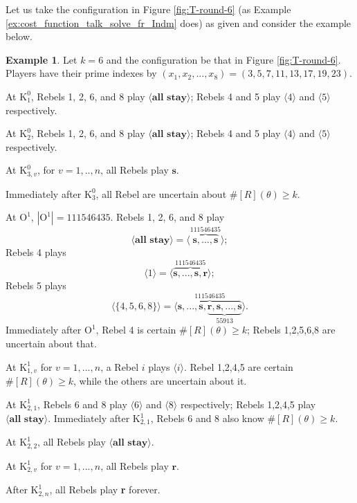\documentclass[12pt,letter]{article}
\newcommand{\Kappa}{\mathrm{K}}
\newcommand{\Omicron}{\mathrm{O}}
\theoremstyle{definition}
\newtheorem{example}{Example}
\theoremstyle{remark}
\theoremstyle{claim}
\begin{document}
Let us take the configuration in Figure \ref{fig:T-round-6} (as Example \ref{ex:cost_function_talk_solve_fr_Indm} does) as given and consider the example below.
\begin{example}
Let $k=6$ and the configuration be that in Figure \ref{fig:T-round-6}. Players have their prime indexes by $(x_1,x_2,...,x_8)=(3,5,7,11,13,17,19,23)$.

At $\Kappa^0_{1}$, Rebels 1, 2, 6, and 8 play $\langle \textbf{all stay} \rangle$; Rebels 4 and 5 play $\langle 4 \rangle$ and $\langle 5 \rangle$ respectively. 

At $\Kappa^0_{2}$, Rebels 1, 2, 6, and 8 play $\langle \textbf{all stay} \rangle$; Rebels 4 and 5 play $\langle 4 \rangle$ and $\langle 5 \rangle$ respectively.

At $\Kappa^0_{3,v}$, for $v=1,..,n$, all Rebels play $\textbf{s} $. 

Immediately after $\Kappa^0_{3}$, all Rebel are uncertain about $\# [R](\theta)\geq k$.

At $\Omicron^1$, $|\Omicron^1|=111546435$. Rebels 1, 2, 6, and 8 play 
\[\langle \textbf{all stay} \rangle=\langle \overbrace{\textbf{s},...,\textbf{s}}^{111546435} \rangle;\] Rebels 4 plays 
\[\langle 1 \rangle=\langle \overbrace{\textbf{s},...,\textbf{s},\textbf{r}}^{111546435} \rangle;\] Rebels 5 plays 
\[\langle \{4,5,6,8\} \rangle=\langle \overbrace{\textbf{s},...,\textbf{s},\underbrace{\textbf{r},\textbf{s},...,\textbf{s}}_{55913}}^{111546435} \rangle.\]
Immediately after $\Omicron^1$, Rebel 4 is certain $\# [R](\theta)\geq k$; Rebels 1,2,5,6,8 are uncertain about that.

At $\Kappa^1_{1,v}$ for $v=1,...,n$, a Rebel $i$ plays $\langle i \rangle$. Rebel 1,2,4,5 are certain $\# [R](\theta)\geq k$, while the others are uncertain about it.

At $\Kappa^1_{2,1}$, Rebels 6 and 8 play $\langle 6 \rangle$ and $\langle 8 \rangle$ respectively; Rebels 1,2,4,5 play $\langle \textbf{all stay} \rangle$. Immediately after $\Kappa^1_{2,1}$, Rebels 6 and 8 also know $\# [R](\theta)\geq k$.

At $\Kappa^1_{2,2}$, all Rebels play $\langle \textbf{all stay} \rangle$.

At $\Kappa^1_{2,v}$ for $v=1,...,n$, all Rebels play $\textbf{r} $. 

After $\Kappa^1_{2,n}$, all Rebels play \textbf{r} forever. 



\end{example}
\end{document}
